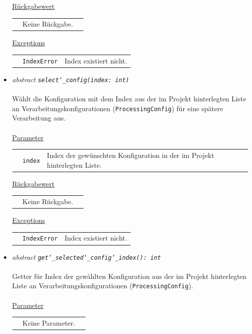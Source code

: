 \documentclass{article}
\begin{document}
\begin{itemize}
\underline{Rückgabewert}\\
\begin{tabular}{lll}
 & Keine Rückgabe.\\
\end{tabular}

\underline{Exceptions}\\
\begin{tabular}{lll}
 & \texttt{IndexError} & Index existiert nicht.\\
\end{tabular}


\item \textit{\flqq{}abstract\frqq} \texttt{\textit{select\char`_config(index: int)}}\\\\
Wählt die Konfiguration mit dem Index  aus der im Projekt hinterlegten Liste an Verarbeitungskonfigurationen (\texttt{ProcessingConfig}) für eine spätere Verarbeitung aus.
\\\\
\underline{Parameter}\\
\begin{tabular}{lll}
 & \texttt{index} & Index der gewünschten Konfiguration in der im Projekt hinterlegten Liste.
\end{tabular}

\underline{Rückgabewert}\\
\begin{tabular}{lll}
 & Keine Rückgabe.\\
\end{tabular}

\underline{Exceptions}\\
\begin{tabular}{lll}
 & \texttt{IndexError} & Index existiert nicht.\\
\end{tabular}


\item \textit{\flqq{}abstract\frqq} \texttt{\textit{get\char`_selected\char`_config\char`_index(): int}}\\\\
Getter für Index der gewählten Konfiguration aus der im Projekt hinterlegten Liste an Verarbeitungskonfigurationen (\texttt{ProcessingConfig}).
\\\\
\underline{Parameter}\\
\begin{tabular}{lll}
 & Keine Parameter.
\end{tabular}


\end{itemize}
\end{document}
